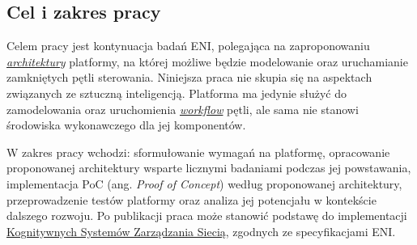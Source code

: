 \subsection{Cel i zakres pracy}

Celem pracy jest kontynuacja badań ENI, polegająca na zaproponowaniu \hyperlink{def:architektura}{\textit{architektury}} platformy, na której możliwe będzie modelowanie oraz uruchamianie zamkniętych pętli sterowania. Niniejsza praca nie skupia się na aspektach związanych ze sztuczną inteligencją. Platforma ma jedynie służyć do zamodelowania oraz uruchomienia \hyperlink{def:workflow}{\textit{workflow}} pętli, ale sama nie stanowi środowiska wykonawczego dla jej komponentów. 

W zakres pracy wchodzi: sformułowanie wymagań na platformę, opracowanie proponowanej architektury wsparte licznymi badaniami podczas jej powstawania, implementacja PoC (ang. \textit{Proof of Concept}) według proponowanej architektury, przeprowadzenie testów platformy oraz analiza jej potencjału w kontekście dalszego rozwoju. Po publikacji praca może stanowić podstawę do implementacji \hyperlink{def:kognitywny-system-zarzadzania-siecia}{Kognitywnych Systemów Zarządzania Siecią}, zgodnych ze specyfikacjami ENI. 